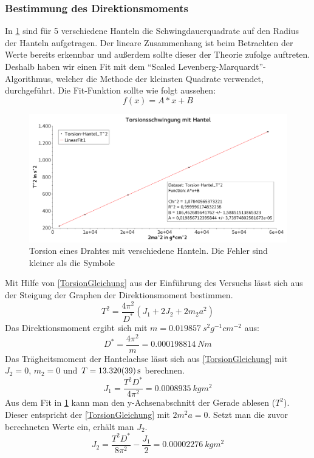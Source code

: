 \documentclass[
	a4paper,
	12pt,
	pagesize,
	ngerman
]{scrartcl}
\begin{document}
	\subsubsection*{Bestimmung des Direktionsmoments}
	In \cref{TorsionGraph} sind für 5 verschiedene Hanteln die Schwingdauerquadrate auf den Radius der Hanteln aufgetragen. Der lineare Zusammenhang ist beim Betrachten der Werte bereits erkennbar und außerdem sollte dieser der Theorie zufolge auftreten. Deshalb haben wir einen Fit mit dem \enquote{Scaled Levenberg-Marquardt}-Algorithmus, welcher die Methode der kleinsten Quadrate verwendet, durchgeführt. Die Fit-Funktion sollte wie folgt aussehen:
	\begin{equation}
		f(x)=A*x+B
	\end{equation}
	\begin{figure}[tb]
		\includegraphics[width=1\textwidth]{Torsion}
		\centering
		\caption{Torsion eines Drahtes mit verschiedene Hanteln. Die Fehler sind kleiner als die Symbole}
		\label{TorsionGraph}
		\centering
	\end{figure}
	Mit Hilfe von \cref{TorsionGleichung} aus der Einführung des Versuchs lässt sich aus der Steigung der Graphen der Direktionsmoment bestimmen.
	\begin{equation}
		\label{TorsionGleichung}
		T^2 = \frac{4\pi^2}{D^*} (J_1 + 2J_2 + 2m_2 a^2)
	\end{equation}
	Das Direktionsmoment ergibt sich mit $m=\SI{0,019857}{s^2g^{-1}cm^{-2}}$ aus:
	\begin{equation}
		D^* = \frac{4\pi^2}{m} = \SI{0,000198814}{Nm} %
	\end{equation}
	Das Trägheitsmoment der Hantelachse lässt sich aus \cref{TorsionGleichung} mit $J_2=0$, $m_2=0$ und $T=\SI{13,32 \pm0,039}{s}$ berechnen.
	\begin{equation}
		J_1= \frac{T^2D^*}{4\pi^2} = \SI{0,0008935}{kgm^2}
	\end{equation}
	Aus dem Fit in \cref{TorsionGraph} kann man den y-Achsenabschnitt der Gerade ablesen ($T^2$). Dieser entspricht der \cref{TorsionGleichung} mit $2m^2a=0$. Setzt man die zuvor berechneten Werte ein, erhält man $J_2$.
	\begin{equation}
		J_2 = \frac{T^2D^*}{8\pi^2} - \frac{J_1}{2} = \SI{0,00002276}{kgm^2}
	\end{equation}
\end{document}
